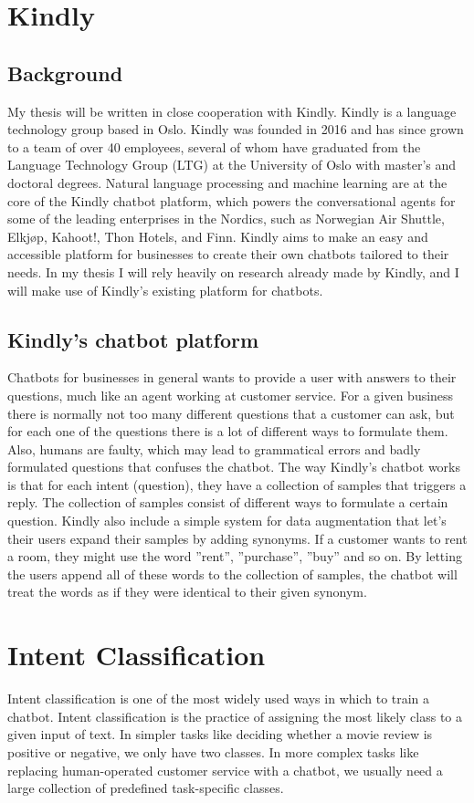 \documentclass{report}
\begin{document}
\section{Kindly}
\subsection{Background}
My thesis will be written in close cooperation with Kindly. Kindly is a language technology group based in Oslo. Kindly was founded in 2016 and has since grown to a team of over 40 employees, several of whom have graduated from the Language Technology Group (LTG) at the University of Oslo with master’s and doctoral degrees. Natural language processing and machine learning are at the core of the Kindly chatbot platform, which powers the conversational agents for some of the leading enterprises in the Nordics, such as Norwegian Air Shuttle, Elkjøp, Kahoot!, Thon Hotels, and Finn. Kindly aims to make an easy and accessible platform for businesses to create their own chatbots tailored to their needs.
In my thesis I will rely heavily on research already made by Kindly, and I will make use of Kindly's existing platform for chatbots.
\subsection{Kindly's chatbot platform}
Chatbots for businesses in general wants to provide a user with answers to their questions, much like an agent working at customer service. For a given business there is normally not too many different questions that a customer can ask, but for each one of the questions there is a lot of different ways to formulate them. Also, humans are faulty, which may lead to grammatical errors and badly formulated questions that confuses the chatbot. The way Kindly's chatbot works is that for each intent (question), they have a collection of samples that triggers a reply. The collection of samples consist of different ways to formulate a certain question. Kindly also include a simple system for data augmentation that let's their users expand their samples by adding synonyms. If a customer wants to rent a room, they might use the word ''rent'', ''purchase'', ''buy'' and so on. By letting the users append all of these words to the collection of samples, the chatbot will treat the words as if they were identical to their given synonym.
\newpage
\section{Intent Classification}
Intent classification is one of the most widely used ways in which to train a chatbot. Intent classification is the practice of assigning the most likely class to a given input of text. In simpler tasks like deciding whether a movie review is positive or negative, we only have two classes. In more complex tasks like replacing human-operated customer service with a chatbot, we usually need a large collection of predefined task-specific classes. 
\end{document}
